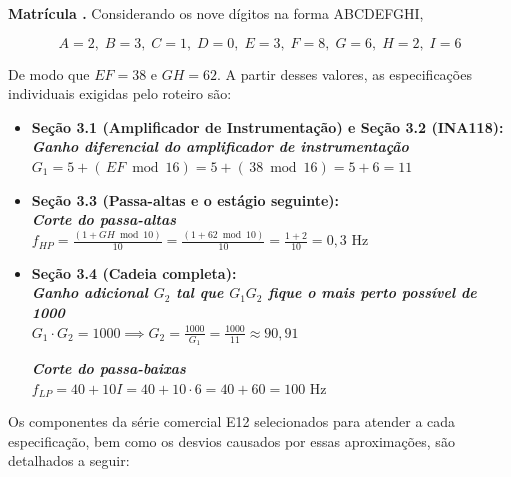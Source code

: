 \documentclass[11pt,a4paper]{article}
\begin{document}
\begin{espec}

\textbf{Matrícula .} Considerando os nove dígitos na forma ABCDEFGHI,

\begin{equation}
    A=2,\; B=3,\; C=1,\; D=0,\; E=3,\; F=8,\; G=6,\; H=2,\; I=6
\end{equation}

De modo que $EF=38$ e $GH=62$. A partir desses valores, as especificações individuais exigidas pelo roteiro são:

\begin{itemize}
    \item \textbf{Seção 3.1 (Amplificador de Instrumentação) e Seção 3.2 (INA118):} \\
    \textbf{\textit{Ganho diferencial do amplificador de instrumentação}} \\
    $G_1 = 5 + (\,EF\bmod 16) = 5 + (\,38\bmod 16) = 5 + 6 = 11$

    \vspace{0.3cm}
    
    \item \textbf{Seção 3.3 (Passa-altas e o estágio seguinte):} \\
    \textbf{\textit{Corte do passa-altas}} \\
    $f_{HP} = \frac{(1+GH \bmod10)}{10} = \frac{(1+62 \bmod10)}{10} = \frac{1+2}{10} = 0{,}3\text{ Hz}$

    \vspace{0.3cm}
    
    \item \textbf{Seção 3.4 (Cadeia completa):} \\
    \textbf{\textit{Ganho adicional $G_{\text{2}}$ tal que $G_{\text{1}}G_\text{2}$ fique o mais perto possível de 1000}} \\
    $G_1 \cdot G_2 = 1000 \implies G_2 = \frac{1000}{G_1} = \frac{1000}{11} \approx 90{,}91$

    \vspace{0.3cm}
    
    \textbf{\textit{Corte do passa-baixas }} \\
    $f_{LP} = 40 + 10I = 40 + 10 \cdot 6 = 40 + 60 = 100\text{ Hz}$
\end{itemize}

\end{espec}

Os componentes da série comercial E12 selecionados para atender a cada especificação, bem como os desvios causados por essas aproximações, são detalhados a seguir:
\end{document}
